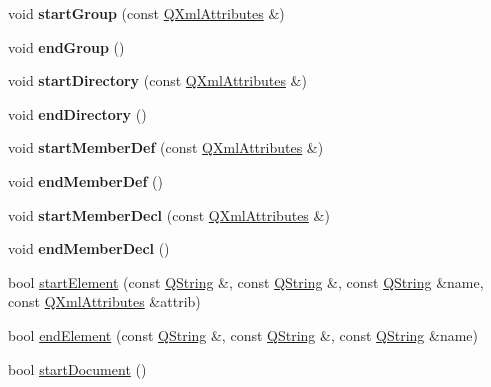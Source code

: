 \begin{DoxyCompactItemize}
\mbox{\label{class_layout_parser_a968de3bc9328f0f0e9a93406001fd293}} 
void {\bfseries start\+Group} (const \mbox{\hyperlink{class_q_xml_attributes}{Q\+Xml\+Attributes}} \&)
\item 
\mbox{\label{class_layout_parser_a07e465e3a3b8f544e0c5857f99200ffa}} 
void {\bfseries end\+Group} ()
\item 
\mbox{\label{class_layout_parser_abc39b9f2b8f2745fbb9aa66e3cfa0a82}} 
void {\bfseries start\+Directory} (const \mbox{\hyperlink{class_q_xml_attributes}{Q\+Xml\+Attributes}} \&)
\item 
\mbox{\label{class_layout_parser_aedf31ed1122667f92f01ee56e9c62a2e}} 
void {\bfseries end\+Directory} ()
\item 
\mbox{\label{class_layout_parser_a3f7a37e5a0c26d8fd9ee8e305f574a98}} 
void {\bfseries start\+Member\+Def} (const \mbox{\hyperlink{class_q_xml_attributes}{Q\+Xml\+Attributes}} \&)
\item 
\mbox{\label{class_layout_parser_a9962ccd9bdd19597ef89c7b70d4d9b71}} 
void {\bfseries end\+Member\+Def} ()
\item 
\mbox{\label{class_layout_parser_adbb62efccf1bc11e82082034fa0ef6cb}} 
void {\bfseries start\+Member\+Decl} (const \mbox{\hyperlink{class_q_xml_attributes}{Q\+Xml\+Attributes}} \&)
\item 
\mbox{\label{class_layout_parser_a4619bdb8c07c8e0ccfc55290e0b92303}} 
void {\bfseries end\+Member\+Decl} ()
\item 
bool \mbox{\hyperlink{class_layout_parser_aa870786ef488ce9d300214dab2c497ae}{start\+Element}} (const \mbox{\hyperlink{class_q_string}{Q\+String}} \&, const \mbox{\hyperlink{class_q_string}{Q\+String}} \&, const \mbox{\hyperlink{class_q_string}{Q\+String}} \&name, const \mbox{\hyperlink{class_q_xml_attributes}{Q\+Xml\+Attributes}} \&attrib)
\item 
bool \mbox{\hyperlink{class_layout_parser_aded617e52b2a221ed57c29ac79da360b}{end\+Element}} (const \mbox{\hyperlink{class_q_string}{Q\+String}} \&, const \mbox{\hyperlink{class_q_string}{Q\+String}} \&, const \mbox{\hyperlink{class_q_string}{Q\+String}} \&name)
\item 
bool \mbox{\hyperlink{class_layout_parser_a69ed2ff63a31f160e166ff79c93f5865}{start\+Document}} ()
\end{DoxyCompactItemize}
